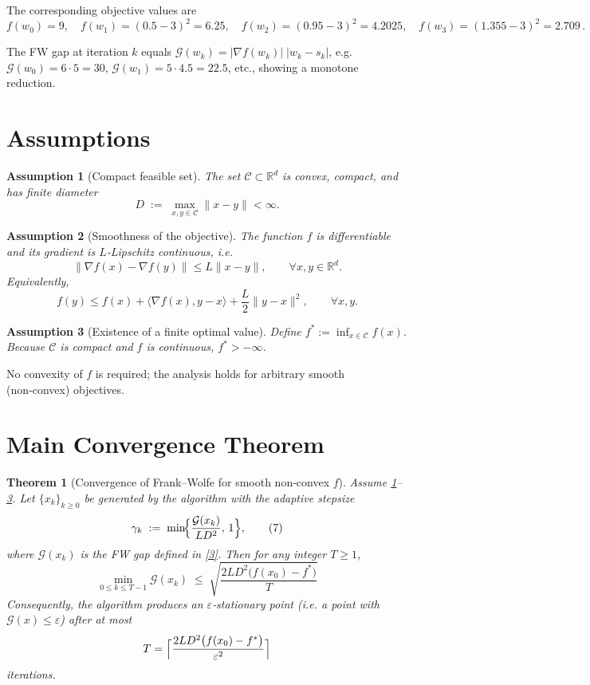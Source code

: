 \documentclass[11pt]{article}
\newtheorem{theorem}{Theorem}[section]
\newtheorem{assumption}{Assumption}[section]
\begin{document}
The corresponding objective values are
\[
f(w_{0})=9,\quad f(w_{1})=(0.5-3)^{2}=6.25,\quad
f(w_{2})=(0.95-3)^{2}=4.2025,\quad
f(w_{3})=(1.355-3)^{2}=2.709\,.
\]

The FW gap at iteration $k$ equals $\mathcal G(w_{k})=|\nabla f(w_{k})|\;|w_{k}-s_{k}|$,
e.g. $\mathcal G(w_{0})=6\cdot5=30$, $\mathcal G(w_{1})=5\cdot4.5=22.5$, etc.,
showing a monotone reduction.

\section{Assumptions}
\label{sec:assumptions}
\begin{assumption}[Compact feasible set]
\label{ass:C}
The set $\mathcal C\subset\mathbb{R}^{d}$ is convex, compact, and has finite
diameter
\[
D \;:=\; \max_{x,y\in\mathcal C}\|x-y\| < \infty .
\]
\end{assumption}

\begin{assumption}[Smoothness of the objective]
\label{ass:L}
The function $f$ is differentiable and its gradient is $L$‑Lipschitz continuous,
i.e.
\[
\|\nabla f(x)-\nabla f(y)\|\le L\|x-y\|,\qquad\forall x,y\in\mathbb{R}^{d}.
\tag{5}
\]
Equivalently,
\[
f(y)\le f(x)+\langle\nabla f(x),y-x\rangle+\frac{L}{2}\|y-x\|^{2},
\qquad\forall x,y.
\tag{6}
\]
\end{assumption}

\begin{assumption}[Existence of a finite optimal value]
\label{ass:opt}
Define $f^{*}:=\inf_{x\in\mathcal C}f(x)$.  Because $\mathcal C$ is compact and $f$
is continuous, $f^{*}>-\infty$.
\end{assumption}

No convexity of $f$ is required; the analysis holds for arbitrary smooth
(non‑convex) objectives.

\section{Main Convergence Theorem}
\label{sec:theorem}
\begin{theorem}[Convergence of Frank–Wolfe for smooth non‑convex $f$]
\label{thm:main}
Assume \ref{ass:C}–\ref{ass:opt}.  
Let $\{x_{k}\}_{k\ge0}$ be generated by the algorithm with the
\emph{adaptive stepsize}
\[
\gamma_{k}\;:=\;\min\!\Bigl\{\frac{\mathcal G(x_{k})}{L D^{2}},\,1\Bigr\},
\tag{7}
\]
where $\mathcal G(x_{k})$ is the FW gap defined in \eqref{3}.  
Then for any integer $T\ge 1$,
\[
\boxed{\;
\min_{0\le k\le T-1}\mathcal G(x_{k})
\;\le\;
\sqrt{\frac{2L D^{2}\bigl(f(x_{0})-f^{*}\bigr)}{T}}
\;}
\tag{8}
\]
Consequently, the algorithm produces an $\varepsilon$‑stationary point
(i.e. a point with $\mathcal G(x)\le\varepsilon$) after at most
\[
T = \Bigl\lceil \frac{2 L D^{2}\bigl(f(x_{0})-f^{*}\bigr)}{\varepsilon^{2}}\Bigr\rceil
\]
iterations.
\end{theorem}
\end{document}

